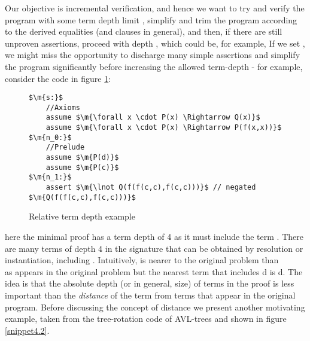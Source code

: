 Our objective is incremental verification, and hence we want to try and verify the program with some term depth limit , 
simplify and trim the program according to the derived equalities (and clauses in general), and then, if there are still unproven assertions,
proceed with depth , which could be, for example, 
If we set , we might miss the opportunity to discharge many simple assertions and simplify the program significantly before increasing the allowed term-depth - for example, consider the code in figure \ref{snippet4.1}:
\begin{figure}
\begin{lstlisting}[tabsize=1]
$\m{s:}$
	//Axioms
	assume $\m{\forall x \cdot P(x) \Rightarrow Q(x)}$
	assume $\m{\forall x \cdot P(x) \Rightarrow P(f(x,x))}$
$\m{n_0:}$
	//Prelude
	assume $\m{P(d)}$
	assume $\m{P(c)}$
$\m{n_1:}$
	assert $\m{\lnot Q(f(f(c,c),f(c,c)))}$ // negated $\m{Q(f(f(c,c),f(c,c)))}$
\end{lstlisting}
\caption{Relative term depth example}
\label{snippet4.1}
\end{figure}
here the minimal proof has a term depth of 4 as it must include the term .
There are many terms of depth 4 in the signature that can be obtained by resolution or instantiation, including .
Intuitively,  is nearer to the original problem than \\
 as  appears in the original problem but the nearest term that includes d is d.
The idea is that the absolute depth (or in general, size) of terms in the proof is less important than the \emph{distance} of the term from terms that appear in the original program.
Before discussing the concept of distance we present another motivating example, taken from the tree-rotation code of AVL-trees and shown in figure \ref{snippet4.2}.

